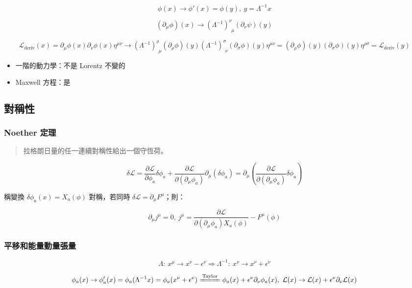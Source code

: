 \documentclass{article}
\begin{document}
$$\phi(x)\to\phi'(x)=\phi(y),\ y=\Lambda^{-1}x$$

$$(\partial_{\mu}\phi)(x)\to(\Lambda^{-1})^{\nu}_{\ \ \mu}(\partial_{\nu}\psi)(y)$$

$$\mathcal{L}_{\mathrm{deriv}}(x)=\partial_{\mu}\phi(x)\partial_{\nu}\phi(x)\eta^{\mu\nu}\to(\Lambda^{-1})^{\rho}_{\ \ \mu}(\partial_{\rho}\phi)(y)(\Lambda^{-1})^{\sigma}_{\ \ \nu}(\partial_{\sigma}\phi)(y)\eta^{\mu\nu}=(\partial_{\rho}\phi)(y)(\partial_{\sigma}\phi)(y)\eta^{\rho\sigma}=\mathcal{L}_{\mathrm{deriv}}(y)$$

\begin{itemize}
\item 一階的動力學：不是 Lorentz 不變的
\item Maxwell 方程：是
\end{itemize}

\subsection{對稱性}

\subsubsection{Noether 定理}

\begin{quote}
拉格朗日量的任一連續對稱性給出一個守恆荷。
\end{quote}

$$\delta\mathcal{L}=\frac{\partial{\mathcal{L}}}{\partial\phi_{a}}\delta\phi_{a}+\frac{\partial\mathcal{L}}{\partial(\partial_{\mu}\phi_a)}\partial_{\mu}(\delta\phi_a)=\partial_{\mu}(\frac{\partial\mathcal{L}}{\partial(\partial_{\mu}\phi_{a})}\delta\phi_a)$$

稱變換 $\delta\phi_a(x)=X_{a}(\phi)$ 對稱，若同時 $\delta\mathcal{L}=\partial_{\mu}F^{\mu}$；則：

$$\partial_{\mu}j^{\mu}=0,\ j^{\mu}=\frac{\partial\mathcal{L}}{\partial(\partial_{\mu}\phi_{a})X_{a}(\phi)}-F^{\mu}(\phi)$$

\subsubsection{平移和能量動量張量}

$$\Lambda:\ x^{\mu}\to x^{\nu}-\epsilon^{\nu}\Rightarrow\Lambda^{-1}:\ x^{\nu}\to x^{\nu}+\epsilon^{\nu}$$

$$\phi_{a}(x)\to\phi'_{a}(x)=\phi_{a}(\Lambda^{-1}x)=\phi_{a}(x^{\nu}+\epsilon^{\nu})\xlongequal{\mathrm{Taylor}}\phi_{a}(x)+\epsilon^{\nu}\partial_{\nu}\phi_{a}(x),\ \mathcal{L}(x)\to\mathcal{L}(x)+\epsilon^{\nu}\partial_{\nu}\mathcal{L}(x)$$
\end{document}
